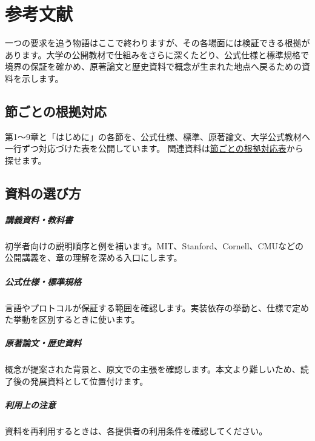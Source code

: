 \chapter{参考文献}
\label{chap:references}

\begin{chapterabstract}
一つの要求を追う物語はここで終わりますが、その各場面には検証できる根拠があります。大学の公開教材で仕組みをさらに深くたどり、公式仕様と標準規格で境界の保証を確かめ、原著論文と歴史資料で概念が生まれた地点へ戻るための資料を示します。
\end{chapterabstract}

\section{節ごとの根拠対応}
\label{sec:99-references-evidence}

第1〜9章と「はじめに」の各節を、公式仕様、標準、原著論文、大学公式教材へ一行ずつ対応づけた表を公開しています。
関連資料は\href{https://github.com/tsuji-tomonori/cs-doc/blob/main/docs/section-evidence.md}{節ごとの根拠対応表}から探せます。


\section{資料の選び方}
\label{sec:99-references-01}
\begingroup
\begingroup
\paragraph{講義資料・教科書}
        初学者向けの説明順序と例を補います。MIT、Stanford、Cornell、CMUなどの公開講義を、章の理解を深める入口にします。

\paragraph{公式仕様・標準規格}
        言語やプロトコルが保証する範囲を確認します。実装依存の挙動と、仕様で定めた挙動を区別するときに使います。

\par
\endgroup
\medskip
\begingroup
\paragraph{原著論文・歴史資料}
        概念が提案された背景と、原文での主張を確認します。本文より難しいため、読了後の発展資料として位置付けます。

\paragraph{利用上の注意}
        資料を再利用するときは、各提供者の利用条件を確認してください。

